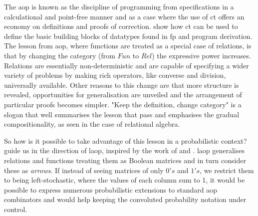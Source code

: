 \documentclass[
  oneside,
  11pt, a4paper,
  footinclude=true,
  headinclude=true,
  cleardoublepage=empty
]{scrbook}
\theoremstyle{definition}
\theoremstyle{definition}
\begin{document}
	        The \gls{aop} \citep{Bird:1997:AP:248932} is known as the discipline of programming from specifications in a calculational and point-free manner and as a case where the use of \gls{ct} offers an economy on definitions and proofs of correction. \cite{Bird:1997:AP:248932} show how \gls{ct} can be used to define the basic building blocks of datatypes found in \gls{fp} and program derivation. The lesson from \gls{aop}, where functions are treated as a special case of relations, is that by changing the category (from $Fun$ to $Rel$) the expressive power increases. Relations are essentially non-deterministic and are capable of specifying a wider variety of problems by making rich operators, like converse and division, universally available. Other reasons to this change are that more structure is revealed, opportunities for generalisation are unveiled and the arrangement of particular proofs becomes simpler. "Keep the definition, change category" is a slogan that well summarises the lesson that \cite{Bird:1997:AP:248932} pass and emphasises the gradual compositionality, as seen in the case of relational algebra.
	        
	        So how is it possible to take advantage of this lesson in a probabilistic context? \cite{Oliveira2016KeepDC} guide us in the direction of \gls{laop}, inspired by the work of \cite{Macedo2012MatricesAA} and \cite{oliveira2012towards}. \gls{laop} generalises relations and functions treating them as Boolean matrices and in turn consider these as \emph{arrows}. If instead of seeing matrices of only $0's$ and $1's$, we restrict them to being left-stochastic, where the values of each column sum to 1, it would be possible to express numerous probabilistic extensions to standard \gls{aop} combinators and would help keeping the convoluted probability notation under control.
	        
\end{document}
